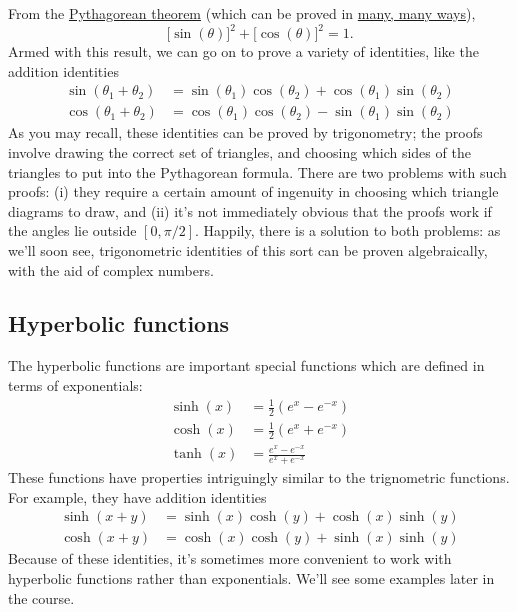 \documentclass[10pt,a4paper]{article}
\begin{document}
From the
\href{http://en.wikipedia.org/wiki/Pythagoras_theorem}{Pythagorean
theorem} (which can be proved in
\href{http://www.faculty.umb.edu/gary_zabel/Courses/Phil\%20281b/Philosophy\%20of\%20Magic/Arcana/Neoplatonism/Pythagoras/index.shtml.html}{many,
many ways}),
\begin{equation}
\big[\sin(\theta)\big]^2 + \big[\cos(\theta)\big]^2 = 1.
\end{equation}
Armed with this result, we can go on to prove a variety of identities,
like the addition identities
\begin{equation}
\begin{aligned}\sin(\theta_1 + \theta_2) &= \sin(\theta_1) \cos(\theta_2) + \cos(\theta_1)\sin(\theta_2) \\\cos(\theta_1 + \theta_2) &= \cos(\theta_1) \cos(\theta_2) - \sin(\theta_1)\sin(\theta_2)\end{aligned}
\end{equation}
As you may recall, these identities can be proved by trigonometry; the
proofs involve drawing the correct set of triangles, and choosing
which sides of the triangles to put into the Pythagorean formula.
There are two problems with such proofs: (i) they require a certain
amount of ingenuity in choosing which triangle diagrams to draw, and
(ii) it's not immediately obvious that the proofs work if the angles
lie outside $[0,\pi/2]$. Happily, there is a solution to both
problems: as we'll soon see, trigonometric identities of this sort can
be proven algebraically, with the aid of complex numbers.

\subsection{Hyperbolic functions}

The hyperbolic functions are important special functions which are
defined in terms of exponentials:
\begin{align}
  \sinh(x) &= \frac{1}{2}\left(e^{x} - e^{-x}\right) \\
  \cosh(x) &= \frac{1}{2}\left(e^{x} + e^{-x}\right) \\
  \tanh(x) &= \frac{e^{x} - e^{-x}}{e^{x} + e^{-x}}
\end{align}
These functions have properties intriguingly similar to the trignometric
functions. For example, they have addition identities
\begin{align}
  \sinh(x+y) &= \sinh(x)\cosh(y) + \cosh(x)\sinh(y) \\
  \cosh(x+y) &= \cosh(x)\cosh(y) + \sinh(x)\sinh(y)
\end{align}
Because of these identities, it's sometimes more convenient to work with
hyperbolic functions rather than exponentials. We'll see some examples
later in the course.
\end{document}
